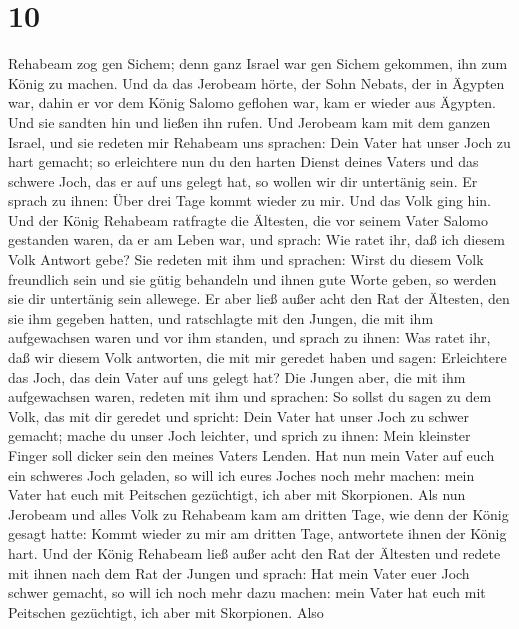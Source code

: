 \hypertarget{section-9}{%
\section{10}\label{section-9}}

 Rehabeam zog gen Sichem; denn ganz Israel war gen Sichem
gekommen, ihn zum König zu machen.  Und da das Jerobeam
hörte, der Sohn Nebats, der in Ägypten war, dahin er vor dem König
Salomo geflohen war, kam er wieder aus Ägypten.  Und sie
sandten hin und ließen ihn rufen. Und Jerobeam kam mit dem ganzen
Israel, und sie redeten mir Rehabeam uns sprachen:  Dein
Vater hat unser Joch zu hart gemacht; so erleichtere nun du den harten
Dienst deines Vaters und das schwere Joch, das er auf uns gelegt hat, so
wollen wir dir untertänig sein.  Er sprach zu ihnen: Über
drei Tage kommt wieder zu mir. Und das Volk ging hin.  Und
der König Rehabeam ratfragte die Ältesten, die vor seinem Vater Salomo
gestanden waren, da er am Leben war, und sprach: Wie ratet ihr, daß ich
diesem Volk Antwort gebe?  Sie redeten mit ihm und sprachen:
Wirst du diesem Volk freundlich sein und sie gütig behandeln und ihnen
gute Worte geben, so werden sie dir untertänig sein allewege.
 Er aber ließ außer acht den Rat der Ältesten, den sie ihm
gegeben hatten, und ratschlagte mit den Jungen, die mit ihm aufgewachsen
waren und vor ihm standen,  und sprach zu ihnen: Was ratet
ihr, daß wir diesem Volk antworten, die mit mir geredet haben und sagen:
Erleichtere das Joch, das dein Vater auf uns gelegt hat? 
Die Jungen aber, die mit ihm aufgewachsen waren, redeten mit ihm und
sprachen: So sollst du sagen zu dem Volk, das mit dir geredet und
spricht: Dein Vater hat unser Joch zu schwer gemacht; mache du unser
Joch leichter, und sprich zu ihnen: Mein kleinster Finger soll dicker
sein den meines Vaters Lenden.  Hat nun mein Vater auf euch
ein schweres Joch geladen, so will ich eures Joches noch mehr machen:
mein Vater hat euch mit Peitschen gezüchtigt, ich aber mit Skorpionen.
 Als nun Jerobeam und alles Volk zu Rehabeam kam am dritten
Tage, wie denn der König gesagt hatte: Kommt wieder zu mir am dritten
Tage,  antwortete ihnen der König hart. Und der König
Rehabeam ließ außer acht den Rat der Ältesten  und redete
mit ihnen nach dem Rat der Jungen und sprach: Hat mein Vater euer Joch
schwer gemacht, so will ich noch mehr dazu machen: mein Vater hat euch
mit Peitschen gezüchtigt, ich aber mit Skorpionen.  Also
